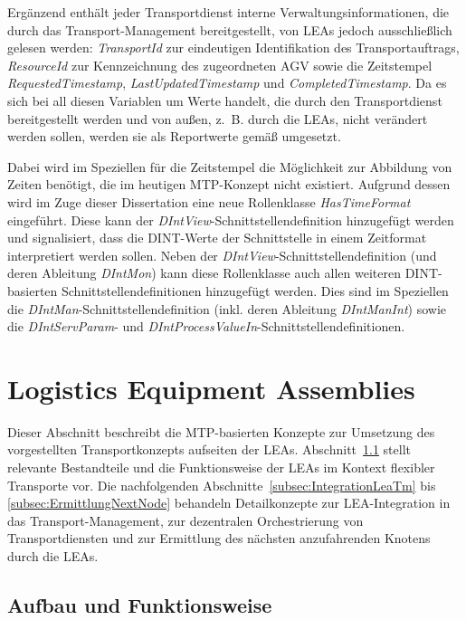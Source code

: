 Ergänzend enthält jeder Transportdienst interne Verwaltungsinformationen, die durch das Transport-Management bereitgestellt, von LEAs jedoch ausschließlich gelesen werden: \emph{TransportId} zur eindeutigen Identifikation des Transportauftrags, \emph{ResourceId} zur Kennzeichnung des zugeordneten AGV sowie die Zeitstempel \emph{RequestedTimestamp}, \emph{LastUpdatedTimestamp} und \emph{CompletedTimestamp}. Da es sich bei all diesen Variablen um Werte handelt, die durch den Transportdienst bereitgestellt werden und von außen, z.~B. durch die LEAs, nicht verändert werden sollen, werden sie als Reportwerte gemäß \cite{PNO.2025.Part4} umgesetzt. 

Dabei wird im Speziellen für die Zeitstempel die Möglichkeit zur Abbildung von Zeiten benötigt, die im heutigen MTP-Konzept nicht existiert. Aufgrund dessen wird im Zuge dieser Dissertation eine neue Rollenklasse \emph{HasTimeFormat} eingeführt. Diese kann der \emph{DIntView}-Schnitt\-stel\-len\-de\-fi\-ni\-ti\-on hinzugefügt werden und signalisiert, dass die DINT-Werte der Schnittstelle in einem Zeitformat interpretiert werden sollen. Neben der \emph{DIntView}-Schnitt\-stel\-len\-de\-fi\-ni\-ti\-on (und deren Ableitung \emph{DIntMon}) kann diese Rollenklasse auch allen weiteren DINT-basierten Schnittstellendefinitionen hinzugefügt werden. Dies sind im Speziellen die \emph{DIntMan}-Schnitt\-stel\-len\-de\-fi\-ni\-ti\-on (inkl. deren Ableitung \emph{DIntManInt}) sowie die \emph{DIntServParam}- und \emph{DIntProcessValueIn}-Schnittstellendefinitionen. 


\section{Logistics Equipment Assemblies}
\label{sec:LogisticsEquipmentAssemblyLA}

Dieser Abschnitt beschreibt die MTP-basierten Konzepte zur Umsetzung des vorgestellten Transportkonzepts aufseiten der LEAs. Abschnitt~\ref{subsec:AufbauFunktionLEA} stellt relevante Bestandteile und die Funktionsweise der LEAs im Kontext flexibler Transporte vor. Die nachfolgenden Abschnitte~\ref{subsec:IntegrationLeaTm} bis \ref{subsec:ErmittlungNextNode} behandeln Detailkonzepte zur LEA-Integration in das Transport-Management, zur dezentralen Orchestrierung von Transportdiensten und zur Ermittlung des nächsten anzufahrenden Knotens durch die LEAs.

\subsection{Aufbau und Funktionsweise}
\label{subsec:AufbauFunktionLEA}

